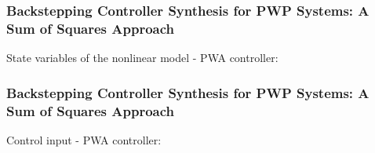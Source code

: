 \documentclass{beamer}
\begin{document}
\frame
  {
    \frametitle{Backstepping Controller Synthesis for PWP Systems: A Sum of Squares Approach}
State variables of the nonlinear model - PWA controller:
\centerline{}    
}

\frame
  {
    \frametitle{Backstepping Controller Synthesis for PWP Systems: A Sum of Squares Approach}
Control input - PWA controller:
\centerline{}    
}
\end{document}
